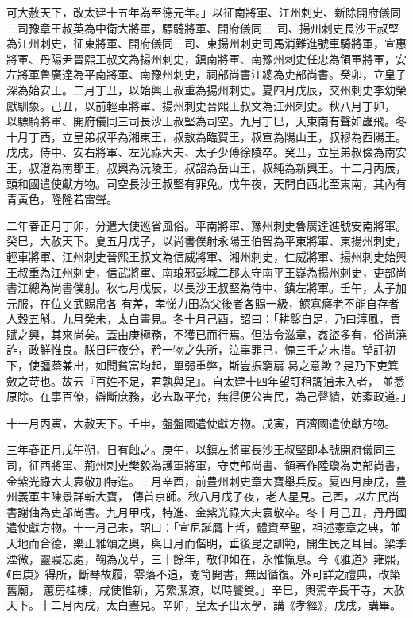 \begin{pinyinscope}
 可大赦天下，改太建十五年為至德元年。」以征南將軍、江州刺史、新除開府儀同三司豫章王叔英為中衛大將軍，驃騎將軍、開府儀同三
 司、揚州刺史長沙王叔堅為江州刺史，征東將軍、開府儀同三司、東揚州刺史司馬消難進號車騎將軍，宣惠將軍、丹陽尹晉熙王叔文為揚州刺史，鎮南將軍、南豫州刺史任忠為領軍將軍，安左將軍魯廣達為平南將軍、南豫州刺史，祠部尚書江總為吏部尚書。癸卯，立皇子深為始安王。二月丁丑，以始興王叔重為揚州刺史。夏四月戊辰，交州刺史李幼榮獻馴象。己丑，以前輕車將軍、揚州刺史晉熙王叔文為江州刺史。秋八月丁卯，
 以驃騎將軍、開府儀同三司長沙王叔堅為司空。九月丁巳，天東南有聲如蟲飛。冬十月丁酉，立皇弟叔平為湘東王，叔敖為臨賀王，叔宣為陽山王，叔穆為西陽王。戊戌，侍中、安右將軍、左光祿大夫、太子少傅徐陵卒。癸丑，立皇弟叔儉為南安王，叔澄為南郡王，叔興為沅陵王，叔韶為岳山王，叔純為新興王。十二月丙辰，頭和國遣使獻方物。司空長沙王叔堅有罪免。戊午夜，天開自西北至東南，其內有青黃色，隆隆若雷聲。



 二年春正月丁卯，分遣大使巡省風俗。平南將軍、豫州刺史魯廣達進號安南將軍。癸巳，大赦天下。夏五月戊子，以尚書僕射永陽王伯智為平東將軍、東揚州刺史，輕車將軍、江州刺史晉熙王叔文為信威將軍、湘州刺史，仁威將軍、揚州刺史始興王叔重為江州刺史，信武將軍、南琅邪彭城二郡太守南平王嶷為揚州刺史，吏部尚書江總為尚書僕射。秋七月戊辰，以長沙王叔堅為侍中、鎮左將軍。壬午，太子加元服，在位文武賜帛各
 有差，孝悌力田為父後者各賜一級，鰥寡癃老不能自存者人穀五斛。九月癸未，太白晝見。冬十月己酉，詔曰：「耕鑿自足，乃曰淳風，貢賦之興，其來尚矣。蓋由庚極務，不獲已而行焉。但法令滋章，姦盜多有，俗尚澆詐，政鮮惟良。朕日旰夜分，矜一物之失所，泣辜罪己，愧三千之未措。望訂初下，使彊蔭兼出，如聞貧富均起，單弱重弊，斯豈振窮扇曷之意歟？是乃下吏箕斂之苛也。故云『百姓不足，君孰與足』。自太建十四年望訂租調逋未入者，
 並悉原除。在事百僚，辯斷庶務，必去取平允，無得便公害民，為己聲績，妨紊政道。」



 十一月丙寅，大赦天下。壬申，盤盤國遣使獻方物。戊寅，百濟國遣使獻方物。



 三年春正月戊午朔，日有蝕之。庚午，以鎮左將軍長沙王叔堅即本號開府儀同三司，征西將軍、荊州刺史樊毅為護軍將軍，守吏部尚書、領著作陸瓊為吏部尚書，金紫光祿大夫袁敬加特進。三月辛酉，前豊州刺史章大寶舉兵反。夏四月庚戌，豊州義軍主陳景詳斬大寶，
 傳首京師。秋八月戊子夜，老人星見。己酉，以左民尚書謝伷為吏部尚書。九月甲戌，特進、金紫光祿大夫袁敬卒。冬十月己丑，丹丹國遣使獻方物。十一月己未，詔曰：「宣尼誕膺上哲，體資至聖，祖述憲章之典，並天地而合德，樂正雅頌之奧，與日月而偕明，垂後昆之訓範，開生民之耳目。梁季湮微，靈寢忘處，鞠為茂草，三十餘年，敬仰如在，永惟愾息。今《雅道》雍熙，《由庚》得所，斷琴故履，零落不追，閱笥開書，無因循復。外可詳之禮典，改築舊廟，
 蕙房桂棟，咸使惟新，芳繁潔潦，以時饗奠。」辛巳，輿駕幸長干寺，大赦天下。十二月丙戌，太白晝見。辛卯，皇太子出太學，講《孝經》，戊戌，講畢。




\end{pinyinscope}
